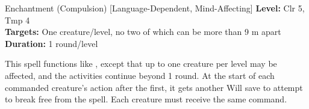 {Enchantment (Compulsion) [Language-Dependent, Mind-Affecting]}
{
	\textbf{Level:}
	Clr 5, Tmp 4\\
	\textbf{Targets:}
	One creature/level, no two of which can be more than 9 m apart\\
	\textbf{Duration:}
	1 round/level\\
}
{
	This spell functions like , except that up to one creature per level may be affected, and the activities continue beyond 1 round. At the start of each commanded creature's action after the first, it gets another Will save to attempt to break free from the spell. Each creature must receive the same command.

}
